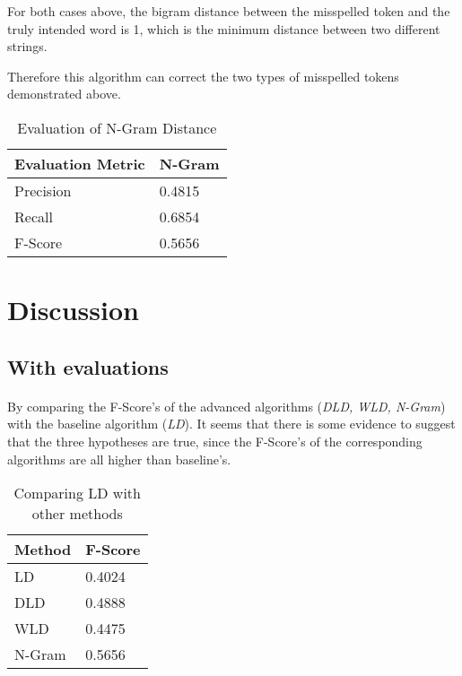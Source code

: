 \documentclass[11pt]{article}
\begin{document}
For both cases above, the bigram distance between the misspelled token and the truly intended word is 1, which is the minimum distance between two different strings. 

Therefore this algorithm can correct the two types of misspelled tokens demonstrated above. 

\begin{table}[!htbp]
 \begin{center}
\begin{tabular}{| l | l |}

      \hline
      Evaluation Metric & N-Gram \\
      \hline\hline
      Precision & 0.4815 \\
      Recall & 0.6854 \\
      F-Score & 0.5656 \\
      \hline

\end{tabular}
\caption{Evaluation of N-Gram Distance}\label{table6}
 \end{center}
\end{table}

\section{Discussion}

\subsection{With evaluations}

\paragraph{} By comparing the F-Score's of the advanced algorithms (\textit{DLD, WLD, N-Gram}) with the baseline algorithm (\textit{LD}). It seems that there is some evidence to suggest that the three hypotheses are true, since the F-Score's of the corresponding algorithms are all higher than baseline's.

\begin{table}[!htbp]
\begin{center}
\begin{tabular}{| l | l |}

      \hline
      Method & F-Score \\
      \hline\hline
      LD & 0.4024 \\
      DLD & 0.4888 \\
      WLD & 0.4475 \\
      N-Gram &  0.5656 \\
      \hline
\end{tabular}

\caption{Comparing LD with other methods}\label{table7}
\end{center}
\end{table}
\end{document}
